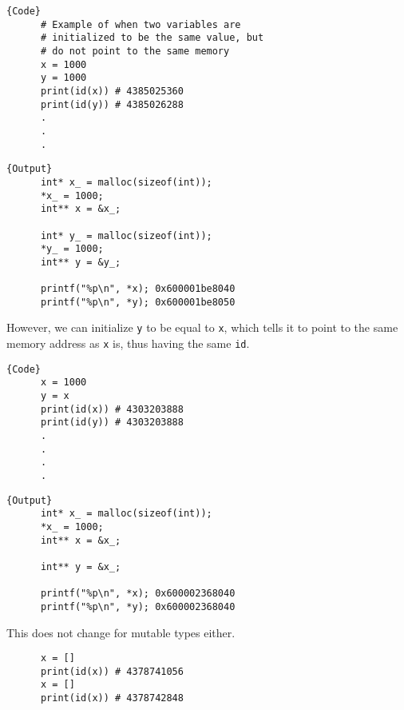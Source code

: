 \documentclass{article}
\begin{document}
    \noindent\begin{minipage}{.5\textwidth}
    \begin{lstlisting}[]{Code}
      # Example of when two variables are 
      # initialized to be the same value, but 
      # do not point to the same memory
      x = 1000
      y = 1000
      print(id(x)) # 4385025360
      print(id(y)) # 4385026288 
      .
      .
      .
    \end{lstlisting}
    \end{minipage}
    \hfill
    \begin{minipage}{.49\textwidth}
    \begin{lstlisting}[]{Output}
      int* x_ = malloc(sizeof(int)); 
      *x_ = 1000; 
      int** x = &x_; 

      int* y_ = malloc(sizeof(int)); 
      *y_ = 1000; 
      int** y = &y_; 

      printf("%p\n", *x); 0x600001be8040 
      printf("%p\n", *y); 0x600001be8050 
    \end{lstlisting}
    \end{minipage}

    However, we can initialize \texttt{y} to be equal to \texttt{x}, which tells it to point to the same memory address as \texttt{x} is, thus having the same \texttt{id}. 

    \noindent\begin{minipage}{.5\textwidth}
    \begin{lstlisting}[]{Code}
      x = 1000 
      y = x 
      print(id(x)) # 4303203888 
      print(id(y)) # 4303203888 
      .
      .
      .
      .
    \end{lstlisting}
    \end{minipage}
    \hfill
    \begin{minipage}{.49\textwidth}
    \begin{lstlisting}[]{Output}
      int* x_ = malloc(sizeof(int)); 
      *x_ = 1000; 
      int** x = &x_; 

      int** y = &x_; 

      printf("%p\n", *x); 0x600002368040 
      printf("%p\n", *y); 0x600002368040 
    \end{lstlisting}
    \end{minipage}

    This does not change for mutable types either. 
    \begin{lstlisting}
      x = [] 
      print(id(x)) # 4378741056
      x = [] 
      print(id(x)) # 4378742848
    \end{lstlisting}
\end{document}
